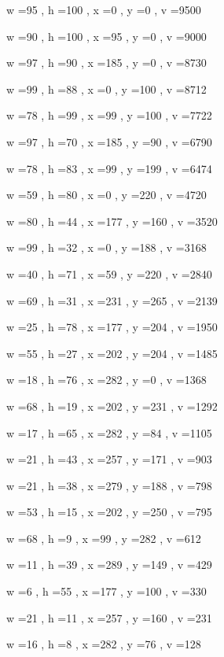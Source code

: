 \documentclass[11pt]{article}
\begin{document}
w =95 , h =100 , x =0 , y =0 , v =9500
\par
w =90 , h =100 , x =95 , y =0 , v =9000
\par
w =97 , h =90 , x =185 , y =0 , v =8730
\par
w =99 , h =88 , x =0 , y =100 , v =8712
\par
w =78 , h =99 , x =99 , y =100 , v =7722
\par
w =97 , h =70 , x =185 , y =90 , v =6790
\par
w =78 , h =83 , x =99 , y =199 , v =6474
\par
w =59 , h =80 , x =0 , y =220 , v =4720
\par
w =80 , h =44 , x =177 , y =160 , v =3520
\par
w =99 , h =32 , x =0 , y =188 , v =3168
\par
w =40 , h =71 , x =59 , y =220 , v =2840
\par
w =69 , h =31 , x =231 , y =265 , v =2139
\par
w =25 , h =78 , x =177 , y =204 , v =1950
\par
w =55 , h =27 , x =202 , y =204 , v =1485
\par
w =18 , h =76 , x =282 , y =0 , v =1368
\par
w =68 , h =19 , x =202 , y =231 , v =1292
\par
w =17 , h =65 , x =282 , y =84 , v =1105
\par
w =21 , h =43 , x =257 , y =171 , v =903
\par
w =21 , h =38 , x =279 , y =188 , v =798
\par
w =53 , h =15 , x =202 , y =250 , v =795
\par
w =68 , h =9 , x =99 , y =282 , v =612
\par
w =11 , h =39 , x =289 , y =149 , v =429
\par
w =6 , h =55 , x =177 , y =100 , v =330
\par
w =21 , h =11 , x =257 , y =160 , v =231
\par
w =16 , h =8 , x =282 , y =76 , v =128
\par
\newpage
\end{document}
